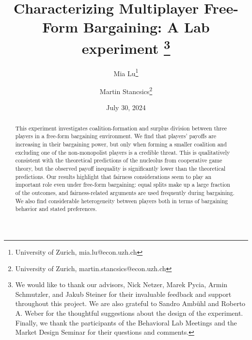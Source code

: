 \documentclass[a4paper,11pt]{article}
\title{
    Characterizing Multiplayer Free-Form Bargaining: A Lab experiment%
    \thanks{
        We would like to thank our advisors, Nick Netzer, Marek Pycia, Armin Schmutzler, and Jakub Steiner for their invaluable feedback and support throughout this project.
        We are also grateful to Sandro Ambühl and Roberto A. Weber for the thoughtful suggestions about the design of the experiment.
        Finally, we thank the participants of the Behavioral Lab Meetings and the Market Design Seminar for their questions and comments.
    }
}
\author{
    Mia Lu\thanks{University of Zurich, mia.lu@econ.uzh.ch} 
    \and 
    Martin Stancsics\thanks{University of Zurich, martin.stancsics@econ.uzh.ch}
}
\date{July 30, 2024 \\\vspace{0.4cm} \latestversion}
\begin{document}
\maketitle

\begin{abstract}
    This experiment investigates coalition-formation and surplus division between three players in a free-form bargaining environment.
    We find that players' payoffs are increasing in their bargaining power, but only when forming a smaller coalition and excluding one of the non-monopolist players is a credible threat.
    This is qualitatively consistent with the theoretical predictions of the nucleolus from cooperative game theory, but the observed payoff inequality is significantly lower than the theoretical predictions.
    Our results highlight that fairness considerations seem to play an important role even under free-form bargaining: equal splits make up a large fraction of the outcomes, and fairness-related arguments are used frequently during bargaining.
    We also find considerable heterogeneity between players both in terms of bargaining behavior and stated preferences.
\end{abstract}



\appendix

\printbibliography


\end{document}
